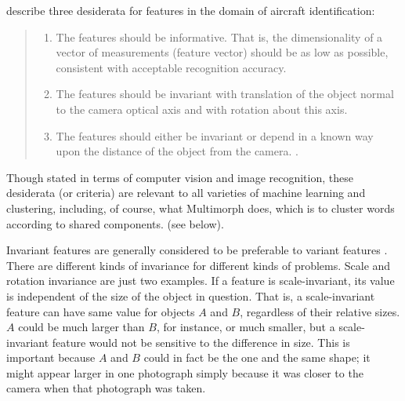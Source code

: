 %
%
\cite{dudani-et-al:1977} describe three desiderata for features in the 
domain of aircraft identification:
\begin{quote}
\begin{enumerate}
\item The features should be informative. That is, the dimensionality of a 
vector of measurements (feature vector) should be as low as possible, 
consistent with acceptable recognition accuracy.
\item The features should be invariant with translation of the object 
normal to the camera optical axis and with rotation about this axis.
\item The features should either be invariant or depend in a known 
way upon the distance of the object from the camera.
\citep[][p. 40]{dudani-et-al:1977}.
\end{enumerate}
\end{quote}
Though stated in terms of computer vision and image recognition, 
these desiderata (or criteria) are relevant to all varieties of machine 
learning and clustering, including, of course, what Multimorph does, which is to
cluster words according to shared components.  
(see below).

Invariant features are generally considered to be preferable to variant 
features \citep{hossain-et-al:2012}. 
There are different kinds of invariance for different kinds of problems.
Scale and rotation invariance are just two examples. If a feature 
is scale-invariant, its
value is independent of the size of the object in question. That is, a 
scale-invariant feature
can have same value for objects $A$ and $B$, regardless of their 
relative sizes. $A$ could be much larger than $B$, for instance, or much smaller,
but a scale-invariant feature would not be sensitive to the difference in size. 
This is important because $A$ and $B$ could in fact be the one and the same shape; it might appear 
larger in one photograph simply because 
it was closer to the camera when that photograph was taken.
 

